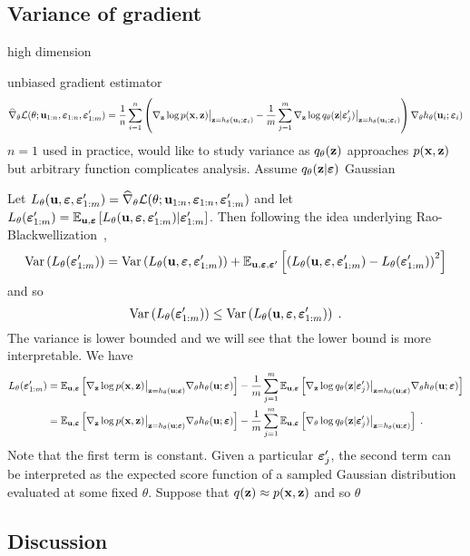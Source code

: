 \documentclass[10pt]{article}
\begin{document}
\subsection{Variance of gradient} \label{sec:variance}

\todo high dimension

unbiased \elbo gradient estimator
\[
\widehat{\nabla}_\theta\mathcal{L}(\theta;\mathbf{u}_{1:n},\bm{\varepsilon}_{1:n},\bm{\varepsilon}_{1:m}') = \frac{1}{n}\sum_{i=1}^n \left(\nabla_{\mathbf{z}}\log p(\mathbf{x},\mathbf{z})\big|_{\mathbf{z}=h_\theta(\mathbf{u}_i;\bm{\varepsilon}_i)} - \frac{1}{m}\sum_{j=1}^m \nabla_{\mathbf{z}}\log q_\theta(\mathbf{z}|\bm{\varepsilon}_j')\big|_{\mathbf{z}=h_\theta(\mathbf{u}_i;\bm{\varepsilon}_i)} \right)\nabla_\theta h_\theta(\mathbf{u}_i;\bm{\varepsilon}_i)
\]
$n=1$ used in practice, would like to study variance as $q_\theta(\mathbf{z})$ approaches $p(\mathbf{x},\mathbf{z})$ but arbitrary function complicates analysis. Assume $q_\theta(\mathbf{z}|\bm{\varepsilon})$ Gaussian

Let $L_\theta(\mathbf{u},\bm{\varepsilon},\bm{\varepsilon}_{1:m}')=\widehat{\nabla}_\theta\mathcal{L}(\theta;\mathbf{u}_{1:n},\bm{\varepsilon}_{1:n},\bm{\varepsilon}_{1:m}')$ and let $L_\theta(\bm{\varepsilon}_{1:m}')=\mathbb{E}_{\mathbf{u},\bm{\varepsilon}}\left[L_\theta(\mathbf{u},\bm{\varepsilon},\bm{\varepsilon}_{1:m}')|\bm{\varepsilon}_{1:m}'\right]$. Then following the idea underlying Rao-Blackwellization~\citep{Ranganath:2014},
\[
\mathrm{Var}\left(L_\theta(\bm{\varepsilon}_{1:m}')\right) = \mathrm{Var}\left(L_\theta(\mathbf{u},\bm{\varepsilon},\bm{\varepsilon}_{1:m}')\right) + \mathbb{E}_{\mathbf{u},\bm{\varepsilon},\bm{\varepsilon}'}\left[\left(L_\theta(\mathbf{u},\bm{\varepsilon},\bm{\varepsilon}_{1:m}')-L_\theta(\bm{\varepsilon}_{1:m}')\right)^2\right]
\]
and so
\[
\mathrm{Var}\left(L_\theta(\bm{\varepsilon}_{1:m}')\right) \leq \mathrm{Var}\left(L_\theta(\mathbf{u},\bm{\varepsilon},\bm{\varepsilon}_{1:m}')\right) \;.
\]
The variance is lower bounded and we will see that the lower bound is more interpretable. We have
\begin{align*}
L_\theta(\bm{\varepsilon}_{1:m}') &= \mathbb{E}_{\mathbf{u},\bm{\varepsilon}}\left[\nabla_{\mathbf{z}}\log p(\mathbf{x},\mathbf{z})\big|_{\mathbf{z}=h_\theta(\mathbf{u};\bm{\varepsilon})}\nabla_\theta h_\theta(\mathbf{u};\bm{\varepsilon})\right] - \frac{1}{m}\sum_{j=1}^m\mathbb{E}_{\mathbf{u},\bm{\varepsilon}}\left[\nabla_{\mathbf{z}}\log q_\theta(\mathbf{z}|\bm{\varepsilon}_j')\big|_{\mathbf{z}=h_\theta(\mathbf{u};\bm{\varepsilon})} \nabla_\theta h_\theta(\mathbf{u};\bm{\varepsilon})\right] \\
&= \mathbb{E}_{\mathbf{u},\bm{\varepsilon}}\left[\nabla_{\mathbf{z}}\log p(\mathbf{x},\mathbf{z})\big|_{\mathbf{z}=h_\theta(\mathbf{u};\bm{\varepsilon})}\nabla_\theta h_\theta(\mathbf{u};\bm{\varepsilon})\right] - \frac{1}{m}\sum_{j=1}^m\mathbb{E}_{\mathbf{u},\bm{\varepsilon}}\left[\nabla_\theta\log q_\theta(\mathbf{z}|\bm{\varepsilon}_j')\big|_{\mathbf{z}=h_\theta(\mathbf{u};\bm{\varepsilon})}\right] \;.
\end{align*}
Note that the first term is constant. Given a particular $\bm{\varepsilon}_j'$, the second term can be interpreted as the expected score function of a sampled Gaussian distribution evaluated at some fixed $\theta$. Suppose that $q(\mathbf{z})\approx p(\mathbf{x},\mathbf{z})$ and so \todo $\theta$


\subsection{Discussion} \label{sec:discussion}


\newpage




\end{document}
